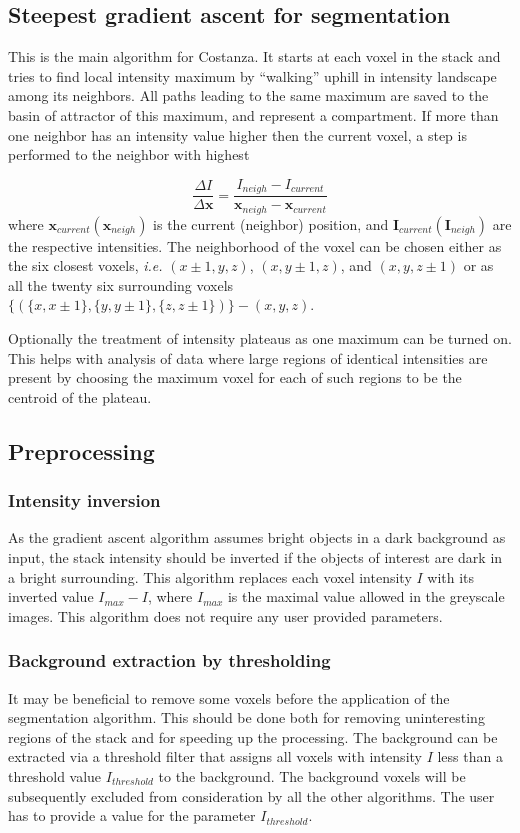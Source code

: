 \documentclass[a4paper,12pt]{article}
\begin{document}
\subsection{Steepest gradient ascent for segmentation}
This is the main algorithm for Costanza. It starts at each voxel in the stack
and tries to find local intensity maximum by ``walking'' uphill in intensity landscape
among its neighbors. All paths leading to the same maximum are saved to the
basin of attractor of this maximum, and represent a compartment. If more than one neighbor
has an intensity value higher then the current voxel, a step is performed to
the neighbor with highest

\begin{equation}
\frac{\Delta I}{\Delta \mathbf{x}} =
\frac{I_{neigh}-I_{current}}{\mathbf{x}_{neigh}-\mathbf{x}_{current}}
\end{equation}
where $\mathbf{x}_{current}(\mathbf{x}_{neigh})$ is the current (neighbor)
position, and $\mathbf{I}_{current}(\mathbf{I}_{neigh})$ are the respective intensities.
The neighborhood of the voxel can be chosen either as the six closest voxels, 	\textit{i.e.}
$(x\pm1,y,z)$, $(x,y\pm1,z)$, and $(x,y,z\pm1)$ or as all the twenty six surrounding voxels $\{(\{x,x\pm1\},\{y,y\pm1\},\{z,z\pm1\})\}-(x,y,z)$.

Optionally the treatment of intensity plateaus as one maximum can be turned on. This helps with analysis of data where large regions of identical intensities are present by choosing the maximum voxel for each of such regions to be the centroid of the plateau. 

\subsection{Preprocessing}

\subsubsection{Intensity inversion}
As the gradient ascent algorithm assumes bright objects in a dark background
as input, the stack intensity should be inverted if the objects of interest
are dark in a bright surrounding. This algorithm replaces each voxel intensity
$I$ with its inverted value $I_{max}-I$, where $I_{max}$ is the maximal value
allowed in the greyscale images. This algorithm does not require any user
provided parameters.

\subsubsection{Background extraction by thresholding}
It may be beneficial to remove some voxels before the application of the
segmentation algorithm. This should be done both for removing uninteresting
regions of the stack and for speeding up the processing. The background can be
extracted via a threshold filter that assigns all voxels with intensity $I$
less than a threshold value $I_{threshold}$ to the background. The background
voxels will be subsequently excluded from consideration by all the other
algorithms. The user has to provide a value for the parameter $I_{threshold}$.
\end{document}
